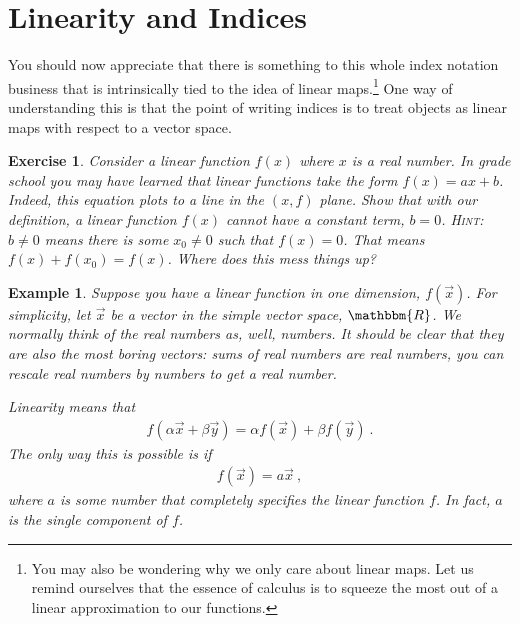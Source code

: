 \documentclass[
  11pt,
	colorful,
	raggedright,
]{tufte-style-thesis-flip}
\newtheorem{exercise}{Exercise}[section]
\newtheorem{example}{Example}[section]
\begin{document}

\section{Linearity and Indices}

You should now appreciate that there is something to this whole index notation business that is intrinsically tied to the idea of linear maps.\footnote{You may also be wondering why we only care about linear maps. Let us remind ourselves that the essence of calculus is to squeeze the most out of a linear approximation to our functions.} One way of understanding this is that the point of writing indices is to treat objects as linear maps with respect to a vector space. 

\begin{exercise}
Consider a linear function $f(x)$ where $x$ is a real number. In grade school you may have learned that linear functions take the form $f(x)= ax+b$. Indeed, this equation plots to a line in the $(x,f)$ plane. Show that with our definition, a linear function $f(x)$ cannot have a constant term, $b=0$. \textsc{Hint}: $b\neq 0$ means there is some $x_0 \neq 0$ such that $f(x)=0$. That means $f(x)+f(x_0) = f(x)$. Where does this mess things up?
\end{exercise}

\begin{example}
Suppose you have a linear function in one dimension, $f(\vec{x})$. For simplicity, let $\vec{x}$ be a vector in the simple vector space, $\mathbbm{R}$. We normally think of the real numbers as, well, numbers. It should be clear that they are also the most boring vectors: sums of real numbers are real numbers, you can rescale real numbers by numbers to get a real number. 


Linearity means that 
\begin{align}
  f(\alpha \vec{x}+\beta\vec{y}) =
  \alpha f(\vec{x})+ \beta f(\vec{y}) \ .
\end{align}
The only way this is possible is if
\begin{align}
  f(\vec{x}) = a\vec{x} \ ,
\end{align}
where $a$ is some number that completely specifies the linear function $f$. In fact, $a$ is the single \emph{component} of $f$. 
\end{example}
\end{document}
